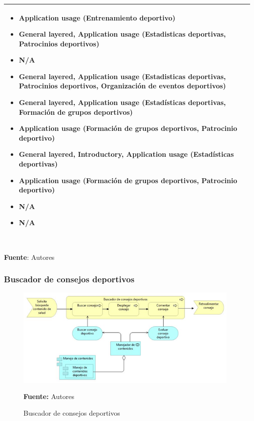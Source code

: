 \begin{table}[!htb]
\begin{center}
{\begin{tabular}{|p{7cm}|p{4cm}|}
\begin{itemize}
				\item Application usage (Entrenamiento deportivo)
				\item General layered, Application usage (Estadisticas deportivas, Patrocinios deportivos)
				\item N/A
				\item General layered, Application usage (Estadisticas deportivas, Patrocinios deportivos, Organización de eventos deportivos)
				\item General layered, Application usage (Estadísticas deportivas, Formación de grupos deportivos)
				\item Application usage (Formación de grupos deportivos, Patrocinio deportivo)
				\item General layered, Introductory, Application usage (Estadísticas deportivas)
				\item Application usage (Formación de grupos deportivos, Patrocinio deportivo)
				\item N/A
				\item N/A
			\end{itemize} 
			\\
			\hline
		\end{tabular}
		} \\
		\textbf{Fuente}: Autores
	\end{center}
\end{table}

\subsubsection{Buscador de consejos deportivos}

\begin{figure}[!htb]
  \begin{center}
    \includegraphics[width=11cm]{./imagenes/application_usage/buscadorconsejosdeportivos.png}
    \caption{Buscador de consejos deportivos}
    \label{fig:BP_BuscadorConsejosDeportivos}
    \textbf{Fuente:}  Autores
  \end{center}
\end{figure}

